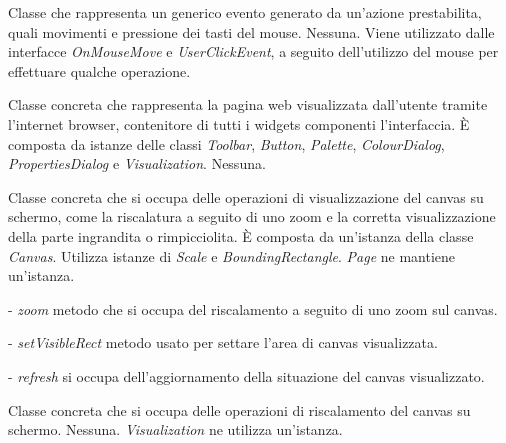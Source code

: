 Classe che rappresenta un generico evento generato da un'azione prestabilita, quali movimenti e pressione dei tasti del mouse.
Nessuna.
Viene utilizzato dalle interfacce \textit{OnMouseMove} e \textit{UserClickEvent}, a seguito dell'utilizzo del mouse per effettuare qualche operazione.

Classe concreta che rappresenta la pagina web visualizzata dall'utente tramite l'internet browser, contenitore di tutti i widgets componenti l'interfaccia.
\` E composta da istanze delle classi \textit{Toolbar}, \textit{Button}, \textit{Palette}, \textit{ColourDialog}, \textit{PropertiesDialog} e \textit{Visualization}.
Nessuna.

Classe concreta che si occupa delle operazioni di visualizzazione del canvas su schermo, come la riscalatura a seguito di uno zoom e la corretta visualizzazione della parte ingrandita o rimpicciolita.
\` E composta da un'istanza della classe \textit{Canvas}. Utilizza istanze di \textit{Scale} e \textit{BoundingRectangle}.
\textit{Page} ne mantiene un'istanza.
\begin{elencopuntato}[\normindent]
\item[-]  \textit{zoom} metodo che si occupa del riscalamento a seguito di uno zoom sul canvas.
\item[-]  \textit{setVisibleRect} metodo usato per settare l'area di canvas visualizzata.
\item[-]  \textit{refresh} si occupa dell'aggiornamento della situazione del canvas visualizzato.
\end{elencopuntato}

Classe concreta che si occupa delle operazioni di riscalamento del canvas su schermo. 
Nessuna.
\textit{Visualization} ne utilizza un'istanza.

